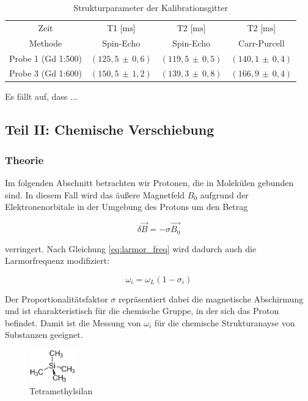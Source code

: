 \documentclass[a4paper]{scrartcl} %
\newcommand{\err}[2]{( #1 \, \pm \, #2 )} %
\begin{document}
\begin{table}[H] 
	\centering
	\caption{Strukturparameter der Kalibrationsgitter}
	\label{tab:relaxtimes}
	\begin{tabular}{cccc}
		\toprule
		Zeit & T1 [$\mathrm{ms}$] & T2 [$\mathrm{ms}$] & T2 [$\mathrm{ms}$]\\
		Methode & Spin-Echo & Spin-Echo & Carr-Purcell\\
		\midrule
		Probe 1 (Gd 1:500)& $\err{125,5}{0,6}$ & $\err{119,5}{0,5}$ & $\err{140,1}{0,4}$\\
		Probe 3 (Gd 1:600)& $\err{150,5}{1,2}$ & $\err{139,3}{0,8}$ & $\err{166,9}{0,4}$\\
		\bottomrule
	\end{tabular}
\end{table}

Es fällt auf, dass ...

\newpage

\subsection{Teil II: Chemische Verschiebung}

\subsubsection{Theorie}

Im folgenden Abschnitt betrachten wir Protonen, die in Molekülen gebunden sind. In diesem Fall wird das äußere Magnetfeld $B_0$ aufgrund der Elektronenorbitale in der Umgebung des Protons um den Betrag

\begin{equation}
	\delta \vec{B} = - \sigma \vec{B_0}
	\label{eq:delta_B}
\end{equation}

verringert. Nach Gleichung \eqref{eq:larmor_freq} wird dadurch auch die Larmorfrequenz modifiziert:

\begin{equation}
	\omega_i = \omega_L \left(1-\sigma_i \right)
	\label{eq:omega_i}
\end{equation}

Der Proportionalitätsfaktor $\sigma$ repräsentiert dabei die magnetische Abschirmung und ist charakteristisch für die chemische Gruppe, in der sich das Proton befindet. Damit ist die Messung von $\omega_i$ für die chemische Strukturanayse von Substanzen geeignet.

\begin{figure}
	\begin{center}
		\includegraphics[width = 0.18\textwidth]{./Resources/Tetramethylsilan.png}
	\end{center}
  \caption{Te\-tramethylsilan}
  \label{fig:TMS}
\end{figure}
\end{document}
